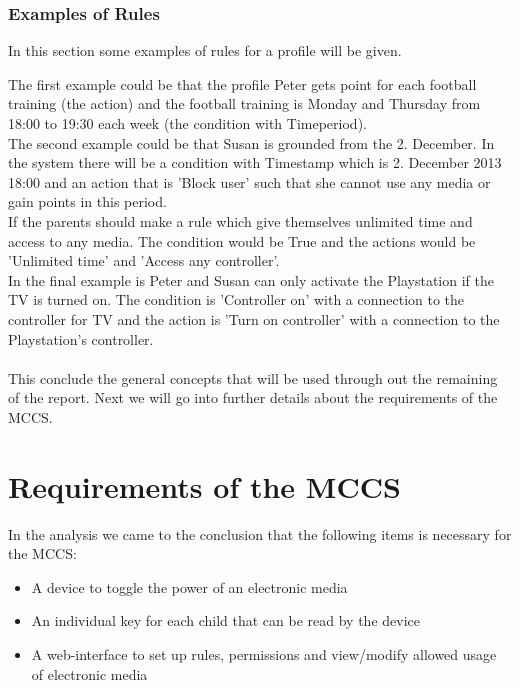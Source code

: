 \subsubsection{Examples of Rules}
In this section some examples of rules for a profile will be given.

The first example could be that the profile Peter gets point for each football training (the action) and the football training is Monday and Thursday from 18:00 to 19:30 each week (the condition with Timeperiod). \\

The second example could be that Susan is grounded from the 2. December. In the system there will be a condition with Timestamp which is 2. December 2013 18:00
and an action that is 'Block user' such that she cannot use any media or gain points in this period. \\

If the parents should make a rule which give themselves unlimited time and access to any media. The condition would be True and the actions would be 'Unlimited time' and 'Access any controller'.\\

In the final example is Peter and Susan can only activate the Playstation if the TV is turned on. The condition is 'Controller on' with a connection to the controller for TV and the action is 'Turn on controller' with a connection to the Playstation's controller.\\\\

This conclude the general concepts that will be used through out the remaining of the report. Next we will go into further details about the requirements of the MCCS.  


\section{Requirements of the MCCS}
\label{sec:RequirMCCS}

In the analysis we came to the conclusion that the following items is necessary for the MCCS: 
\begin{itemize}
	\item A device to toggle the power of an electronic media
	\item An individual key for each child that can be read by the device
	\item A web-interface to set up rules, permissions and view/modify allowed usage of electronic media
\end{itemize} 


